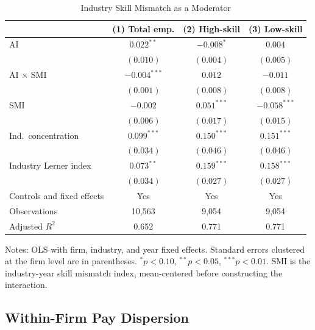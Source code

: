 \documentclass[12pt,a4paper]{article}
\theoremstyle{predstyle}
\theoremstyle{plain}
\newcommand{\SMI}{\mathrm{SMI}}
\begin{document}
\begin{table}[H]
\centering
\caption{Industry Skill Mismatch as a Moderator}
\label{tab:smi}
\begin{threeparttable}
\scriptsize
\setlength{\tabcolsep}{4pt}
\begin{tabular}{lccc}
\toprule
 & (1) Total emp. & (2) High-skill & (3) Low-skill \\
\midrule
AI & \(0.022^{**}\) & \(-0.008^{*}\) & \(0.004\) \\
 & \((0.010)\) & \((0.004)\) & \((0.005)\) \\
AI \(\times\) SMI & \(-0.004^{***}\) & \(0.012\) & \(-0.011\) \\
 & \((0.001)\) & \((0.008)\) & \((0.008)\) \\
SMI & \(-0.002\) & \(0.051^{***}\) & \(-0.058^{***}\) \\
 & \((0.006)\) & \((0.017)\) & \((0.015)\) \\
Ind.\ concentration & \(0.099^{***}\) & \(0.150^{***}\) & \(0.151^{***}\) \\
 & \((0.034)\) & \((0.046)\) & \((0.046)\) \\
Industry Lerner index & \(0.073^{**}\) & \(0.159^{***}\) & \(0.158^{***}\) \\
 & \((0.034)\) & \((0.027)\) & \((0.027)\) \\
Controls and fixed effects & Yes & Yes & Yes \\
\midrule
Observations & 10,563 & 9,054 & 9,054 \\
Adjusted \(R^2\) & 0.652 & 0.771 & 0.771 \\
\bottomrule
\end{tabular}
\begin{tablenotes}
\footnotesize
\item Notes: OLS with firm, industry, and year fixed effects. Standard errors clustered at the firm level are in parentheses. \(^{*}p<0.10\), \(^{**}p<0.05\), \(^{***}p<0.01\). \(\SMI\) is the industry-year skill mismatch index, mean-centered before constructing the interaction.
\end{tablenotes}
\end{threeparttable}
\end{table}

\subsection{Within-Firm Pay Dispersion}
\label{sec:wageprem}
\end{document}
